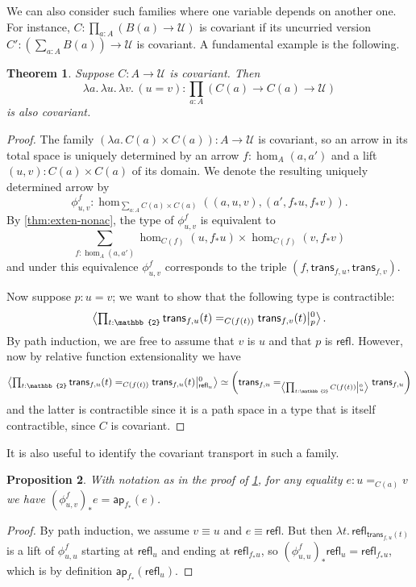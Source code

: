 \documentclass{amsart}
\theoremstyle{plain}
\newtheorem{thm}{Theorem}[section]
\newtheorem{prop}[thm]{Proposition}
\theoremstyle{definition}
\theoremstyle{remark}
\numberwithin{equation}{section}
\newcommand{\exten}[4]{\left\langle\mathchoice{\textstyle\prod_{#1}}{\textstyle\prod_{#1}}{\scriptstyle\prod_{#1}}{\scriptscriptstyle\prod_{#1}} #2 \middle|^{#3}_{#4}\right\rangle}
\newcommand{\jdeq}{\equiv}
\newcommand{\univtype}{\mathcal{U}}
\newcommand{\refl}{\mathsf{refl}}
\newcommand{\lam}[1]{\lambda #1.\,}
\newcommand{\two}{\mathbb{2}}
\newcommand{\ap}{\mathsf{ap}}                             %
\newcommand{\covtr}[1]{{#1}_*}  %
\newcommand{\istrans}[2]{\mathsf{trans}_{#1,#2}}
\begin{document}
We can also consider such families where one variable depends on another one.
For instance, $C : \prod_{a:A} (B(a) \to\univtype)$ is covariant if its uncurried version $C' : \left(\sum_{a:A} B(a)\right) \to \univtype$ is covariant.
A fundamental example is the following.

\begin{thm}\label{thm:eq-covar}
  Suppose $C:A\to\univtype$ is covariant.
  Then
  \[\lam{a}\lam{u}\lam{v} (u=v) : \prod_{a:A} (C(a) \to C(a) \to \univtype)\]
  is also covariant.
\end{thm}
\begin{proof}
  The family $(\lam{a} C(a)\times C(a)) : A \to \univtype$ is covariant, so an arrow in its total space is uniquely determined by an arrow $f:\hom_A(a,a')$ and a lift $(u,v) : C(a)\times C(a)$ of its domain.
  We denote the resulting uniquely determined arrow by
  \[ \phi^f_{u,v} : \hom_{\sum_{a:A} C(a)\times C(a)}((a,u,v),(a',\covtr f u,\covtr f v)). \]
  By \cref{thm:exten-nonac}, the type of $\phi^f_{u,v}$ is equivalent to
  \[ \sum_{f:\hom_A(a,a')} \hom_{C(f)}(u,\covtr f u) \times \hom_{C(f)}(v,\covtr f v) \]
  and under this equivalence $\phi^f_{u,v}$ corresponds to the triple $(f,\istrans f u, \istrans f v)$.

  Now suppose $p:u=v$; we want to show that the following type is contractible:
  \[ \exten{t:\two}{\istrans f u(t) =_{C(f(t))} \istrans f v(t)}{0}{p}. \]
  By path induction, we are free to assume that $v$ is $u$ and that $p$ is $\refl$.
  However, now by relative function extensionality we have
  \[ \exten{t:\two}{\istrans f u(t) =_{C(f(t))} \istrans f u(t)}{0}{\refl_u}
  \simeq
  \left(\istrans f u =_{\exten{t:\two}{C(f(t))}{0}{u}} \istrans f u\right)
  \]
  and the latter is contractible since it is a path space in a type that is itself contractible, since $C$ is covariant.
\end{proof}

It is also useful to identify the covariant transport in such a family.

\begin{prop}\label{thm:eq-covtr-ap}
  With notation as in the proof of \cref{thm:eq-covar}, for any equality $e:u=_{C(a)} v$ we have $\covtr {(\phi^f_{u,v})}{e} = \ap_{\covtr f }(e)$.
\end{prop}
\begin{proof}
  By path induction, we assume $v\jdeq u$ and $e\jdeq \refl$.
  But then $\lam{t} \refl_{\istrans f u(t)}$ is a lift of $\phi^f_{u,u}$ starting at $\refl_u$ and ending at $\refl_{\covtr f u}$, so $\covtr {(\phi^f_{u,u})}{\refl_u} = \refl_{\covtr f u}$, which is by definition $\ap_{\covtr f }(\refl_u)$.
\end{proof}
\end{document}
